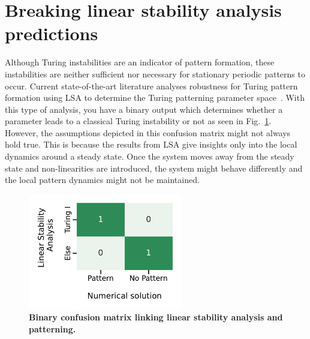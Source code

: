 \section{Breaking linear stability analysis predictions}
Although Turing instabilities are an indicator of pattern formation, these instabilities are neither sufficient nor necessary for stationary periodic patterns to occur.
Current state-of-the-art literature analyses robustness for Turing pattern formation using LSA to determine the Turing patterning parameter space~\parencite{Scholes2019, Zheng2016, Marcon}.
With this type of analysis, you have a binary output which determines whether a parameter leads to a classical Turing instability or not as seen in Fig.~\ref{fig:lsa_numerical_confusion_literature}.
However, the assumptions depicted in this confusion matrix might not always hold true.
This is because the results from LSA give insights only into the local dynamics around a steady state.
Once the system moves away from the steady state and non-linearities are introduced, the system might behave differently and the local pattern dynamics might not be maintained.


\begin{figure}[H] %
    \centering
    \includegraphics[width=0.6\textwidth]{chapters/Chapter 1/lsa_vs_numerical_confusion_literature} %
    \caption{\textbf{Binary confusion matrix linking linear stability analysis and patterning.}}
    \label{fig:lsa_numerical_confusion_literature} %
\end{figure}


